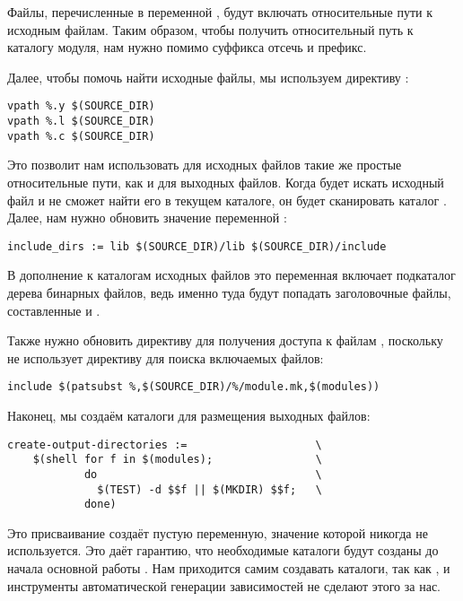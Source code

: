 Файлы, перечисленные в переменной , будут
включать относительные пути к исходным файлам. Таким образом, чтобы
получить относительный путь к каталогу модуля, нам нужно помимо
суффикса  отсечь и префикс.

Далее, чтобы помочь \GNUmake{} найти исходные файлы, мы используем
директиву :

{\footnotesize
\begin{verbatim}
vpath %.y $(SOURCE_DIR)
vpath %.l $(SOURCE_DIR)
vpath %.c $(SOURCE_DIR)
\end{verbatim}
}

Это позволит нам использовать для исходных файлов такие же простые
относительные пути, как и для выходных файлов. Когда \GNUmake{} будет
искать исходный файл и не сможет найти его в текущем каталоге, он
будет сканировать каталог . Далее, нам нужно
обновить значение переменной :

{\footnotesize
\begin{verbatim}
include_dirs := lib $(SOURCE_DIR)/lib $(SOURCE_DIR)/include
\end{verbatim}
}

В дополнение к каталогам исходных файлов это переменная включает
подкаталог  дерева бинарных файлов, ведь именно туда
будут попадать заголовочные файлы, составленные  и
.

Также нужно обновить директиву  для получения
доступа к файлам , поскольку \GNUmake{} не
использует директиву  для поиска включаемых файлов:

{\footnotesize
\begin{verbatim}
include $(patsubst %,$(SOURCE_DIR)/%/module.mk,$(modules))
\end{verbatim}
}

Наконец, мы создаём каталоги для размещения выходных файлов:

{\footnotesize
\begin{verbatim}
create-output-directories :=                    \
    $(shell for f in $(modules);                \
            do                                  \
              $(TEST) -d $$f || $(MKDIR) $$f;   \
            done)
\end{verbatim}
}

Это присваивание создаёт пустую переменную, значение которой никогда
не используется. Это даёт гарантию, что необходимые каталоги будут
созданы до начала основной работы \GNUmake{}. Нам приходится самим
создавать каталоги, так как ,  и
инструменты автоматической генерации зависимостей не сделают этого за
нас.

